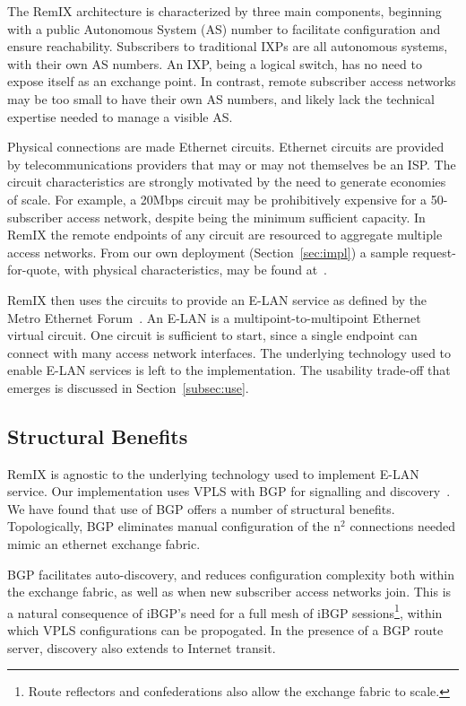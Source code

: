 The RemIX architecture is characterized by three main components, beginning with
a public Autonomous System (AS) number to facilitate configuration and ensure
reachability. Subscribers to traditional IXPs are all autonomous systems, with
their own AS numbers. An IXP, being a logical switch, has no need to expose
itself as an exchange point. In contrast, remote subscriber access networks may
be too small to have their own AS numbers, and likely lack the technical
expertise needed to manage a visible AS. 

Physical connections are made Ethernet circuits. Ethernet circuits are provided
by telecommunications providers that may or may not themselves be an ISP. The
circuit characteristics are strongly motivated by the need to generate economies
of scale. For example, a 20Mbps circuit may be prohibitively expensive for a
50-subscriber access network, despite being the minimum sufficient capacity. In
RemIX the remote endpoints of any circuit are resourced to aggregate multiple
access networks. From our own deployment (Section~\ref{sec:impl}) a sample
request-for-quote, with physical characteristics, may be found at~\cite{rfq}.

RemIX then uses the circuits to provide an E-LAN service as defined by the Metro
Ethernet Forum~\cite{mef62}. An E-LAN is a multipoint-to-multipoint Ethernet
virtual circuit. One circuit is sufficient to start, since a single endpoint can
connect with many access network interfaces. The underlying technology used to
enable E-LAN services is left to the implementation. The usability trade-off that emerges is discussed in Section~\ref{subsec:use}.

\subsection{Structural Benefits}

RemIX is agnostic to the underlying technology used to implement E-LAN service.
Our implementation uses VPLS with BGP for signalling and
discovery~\cite{vpls-bgp}. We have found that use of BGP offers a number of
structural benefits. Topologically, BGP eliminates manual configuration of the
n$^2$ connections needed mimic an ethernet exchange fabric.

BGP facilitates auto-discovery, and reduces configuration complexity both within
the exchange fabric, as well as when new subscriber access networks join. This
is a natural consequence of iBGP's need for a full mesh of iBGP
sessions\footnote{Route reflectors and confederations also allow the exchange
fabric to scale.}, within which VPLS configurations can be propogated. In the
presence of a BGP route server, discovery also extends to Internet transit.

